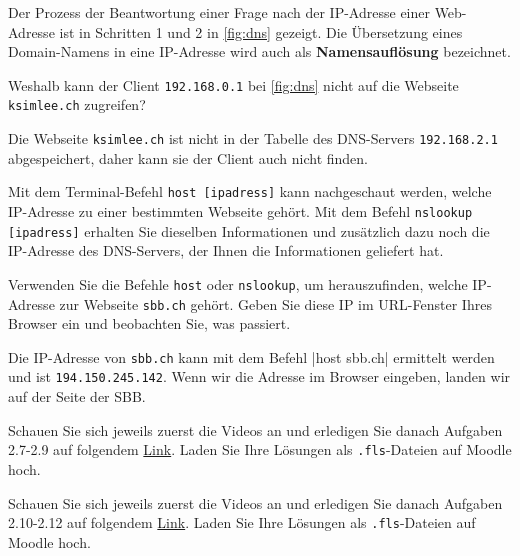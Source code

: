 Der Prozess der Beantwortung einer Frage nach der IP-Adresse einer Web-Adresse ist in Schritten 1 und 2 in \cref{fig:dns} gezeigt. Die Übersetzung eines Domain-Namens in eine \gls{IP}-Adresse wird auch als \textbf{Namensauflösung} bezeichnet.

\begin{myexercise}
Weshalb kann der Client \texttt{192.168.0.1} bei \cref{fig:dns} nicht auf die Webseite \texttt{ksimlee.ch} zugreifen?
\begin{myanswer}
Die Webseite \texttt{ksimlee.ch} ist nicht in der Tabelle des \gls{DNS}-Servers \texttt{192.168.2.1} abgespeichert, daher kann sie der Client auch nicht finden.
\end{myanswer}
\end{myexercise}


Mit dem Terminal-Befehl \texttt{host [ipadress]} kann nachgeschaut werden, welche \gls{IP}-Adresse zu einer bestimmten Webseite gehört. Mit dem Befehl \texttt{nslookup [ipadress]} erhalten Sie dieselben Informationen und zusätzlich dazu noch die \gls{IP}-Adresse des \gls{DNS}-Servers, der Ihnen die Informationen geliefert hat.



\begin{myexercise}
Verwenden Sie die Befehle \texttt{host} oder \texttt{nslookup}, um herauszufinden, welche \gls{IP}-Adresse zur Webseite \texttt{sbb.ch} gehört. Geben Sie diese \gls{IP} im URL-Fenster Ihres Browser ein und beobachten Sie, was passiert.
\begin{myanswer}
Die IP-Adresse von \texttt{sbb.ch} kann mit dem Befehl \commandbox|host sbb.ch| ermittelt werden und ist \texttt{194.150.245.142}. Wenn wir die Adresse im Browser eingeben, landen wir auf der Seite der SBB.
\end{myanswer}
\end{myexercise}

\begin{mysubmission}
Schauen Sie sich jeweils zuerst die Videos an und erledigen Sie danach Aufgaben 2.7-2.9 auf folgendem \href{https://informatik.mygymer.ch/base/?page=network/2-filius/7-web/}{Link}. Laden Sie Ihre Lösungen als \texttt{.fls}-Dateien auf Moodle hoch.
\end{mysubmission}

\begin{mysubmission}
Schauen Sie sich jeweils zuerst die Videos an und erledigen Sie danach Aufgaben 2.10-2.12 auf folgendem \href{https://informatik.mygymer.ch/base/?page=network/2-filius/A-dns/}{Link}. Laden Sie Ihre Lösungen als \texttt{.fls}-Dateien auf Moodle hoch.
\end{mysubmission}

